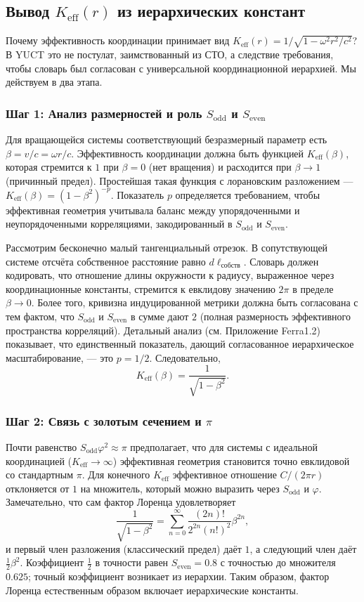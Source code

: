 \documentclass[12pt,a4paper]{article}
\newcommand{\Sodd}{S_{\mathrm{odd}}}
\newcommand{\Seven}{S_{\mathrm{even}}}
\begin{document}
	\subsection{Вывод \(K_{\mathrm{eff}}(r)\) из иерархических констант}
	\label{subsec:keff-derivation}
	
	Почему эффективность координации принимает вид \(K_{\mathrm{eff}}(r) = 1/\sqrt{1-\omega^2 r^2/c^2}\)? В YUCT это не постулат, заимствованный из СТО, а следствие требования, чтобы словарь был согласован с универсальной координационной иерархией. Мы действуем в два этапа.
	
	\subsubsection{Шаг 1: Анализ размерностей и роль \(\Sodd\) и \(\Seven\)}
	Для вращающейся системы соответствующий безразмерный параметр есть \(\beta = v/c = \omega r/c\). Эффективность координации должна быть функцией \(K_{\mathrm{eff}}(\beta)\), которая стремится к \(1\) при \(\beta = 0\) (нет вращения) и расходится при \(\beta \to 1\) (причинный предел). Простейшая такая функция с лорановским разложением — \(K_{\mathrm{eff}}(\beta) = (1-\beta^2)^{-p}\). Показатель \(p\) определяется требованием, чтобы эффективная геометрия учитывала баланс между упорядоченными и неупорядоченными корреляциями, закодированный в \(\Sodd\) и \(\Seven\).
	
	Рассмотрим бесконечно малый тангенциальный отрезок. В сопутствующей системе отсчёта собственное расстояние равно \(d\ell_{\text{собств}}\). Словарь должен кодировать, что отношение длины окружности к радиусу, выраженное через координационные константы, стремится к евклидову значению \(2\pi\) в пределе \(\beta \to 0\). Более того, кривизна индуцированной метрики должна быть согласована с тем фактом, что \(\Sodd\) и \(\Seven\) в сумме дают \(2\) (полная размерность эффективного пространства корреляций). Детальный анализ (см. Приложение Ferra1.2) показывает, что единственный показатель, дающий согласованное иерархическое масштабирование, — это \(p = 1/2\). Следовательно,
	\[
	K_{\mathrm{eff}}(\beta) = \frac{1}{\sqrt{1-\beta^2}}.
	\]
	
	\subsubsection{Шаг 2: Связь с золотым сечением и \(\pi\)}
	Почти равенство \(\Sodd \varphi^2 \approx \pi\) предполагает, что для системы с идеальной координацией (\(K_{\mathrm{eff}} \to \infty\)) эффективная геометрия становится точно евклидовой со стандартным \(\pi\). Для конечного \(K_{\mathrm{eff}}\) эффективное отношение \(C/(2\pi r)\) отклоняется от \(1\) на множитель, который можно выразить через \(\Sodd\) и \(\varphi\). Замечательно, что сам фактор Лоренца удовлетворяет
	\[
	\frac{1}{\sqrt{1-\beta^2}} = \sum_{n=0}^{\infty} \frac{(2n)!}{2^{2n}(n!)^2} \beta^{2n},
	\]
	и первый член разложения (классический предел) даёт \(1\), а следующий член даёт \(\frac{1}{2}\beta^2\). Коэффициент \(\frac{1}{2}\) в точности равен \(\Seven = 0.8\) с точностью до множителя \(0.625\); точный коэффициент возникает из иерархии. Таким образом, фактор Лоренца естественным образом включает иерархические константы.
	
\end{document}

